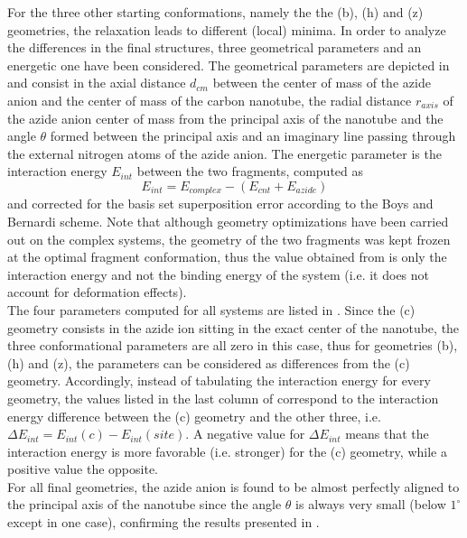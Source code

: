 \documentclass[utf8]{article}
\begin{document}
For the three other starting conformations, namely the the (b), (h) and (z) geometries, the relaxation leads to different (local) minima.
In order to analyze the differences in the final structures, three geometrical parameters and an energetic one have been considered.
The geometrical parameters are depicted in  and consist in the axial distance $d_{cm}$ between the center of mass of the azide anion and the center of mass of the carbon nanotube, the radial distance $r_{axis}$ of the azide anion center of mass from the principal axis of the nanotube and the angle $\theta$ formed between the principal axis and an imaginary line passing through the external nitrogen atoms of the azide anion.
The energetic parameter is the interaction energy $E_{int}$ between the two fragments, computed as
%
\begin{equation}
    E_{int} = E_{complex} - (E_{cnt} + E_{azide})
    \label{eq:eint}
\end{equation}
%
and corrected for the basis set superposition error according to the Boys and Bernardi scheme\cite{Boys1970}.
Note that although geometry optimizations have been carried out on the complex systems, the geometry of the two fragments was kept frozen at the optimal fragment conformation, thus the value obtained from  is only the interaction energy and not the binding energy of the system (i.e. it does not account for deformation effects).\\
The four parameters computed for all systems are listed in . Since the (c) geometry consists in the azide ion sitting in the exact center of the nanotube, the three conformational parameters are all zero in this case, thus for geometries (b), (h) and (z), the parameters can be considered as differences from the (c) geometry. Accordingly, instead of tabulating the interaction energy for every geometry, the values listed in the last column of  correspond to the interaction energy difference between the (c) geometry and the other three, i.e. $\Delta E_{int} = E_{int}(c) - E_{int}(site)$. A negative value for $\Delta E_{int}$ means that the interaction energy is more favorable (i.e. stronger) for the (c) geometry, while a positive value the opposite.\\
For all final geometries, the azide anion is found to be almost perfectly aligned to the principal axis of the nanotube since the angle $\theta$ is always very small (below $1^{\circ}$ except in one case), confirming the results presented in \cite{Battaglia2017a}.
\end{document}
